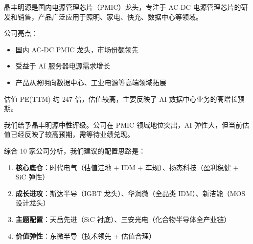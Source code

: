 晶丰明源是国内电源管理芯片（PMIC）龙头，专注于 AC-DC 电源管理芯片的研发和销售，产品广泛应用于照明、家电、快充、数据中心等领域。

公司亮点：
\begin{itemize}[leftmargin=2em]
\item 国内 AC-DC PMIC 龙头，市场份额领先
\item 受益于 AI 服务器电源需求增长
\item 产品从照明向数据中心、工业电源等高端领域拓展
\end{itemize}

估值 PE(TTM) 约 247 倍，估值较高，主要反映了 AI 数据中心业务的高增长预期。

我们给予晶丰明源\textbf{中性}评级。公司在 PMIC 领域地位突出，AI 弹性大，但当前估值已经反映了较高预期，需等待业绩兑现。

\begin{keyinsight}[重点公司投资地图]
综合 10 家公司分析，我们建议的配置思路是：
\begin{enumerate}[leftmargin=2em]
\item \textbf{核心底仓}：时代电气（估值洼地 + IDM + 车规）、扬杰科技（盈利稳健 + SiC 弹性）
\item \textbf{成长进攻}：斯达半导（IGBT 龙头）、华润微（全品类 IDM）、新洁能（MOS 设计龙头）
\item \textbf{主题配置}：天岳先进（SiC 衬底）、三安光电（化合物半导体全产业链）
\item \textbf{价值弹性}：东微半导（技术领先 + 估值合理）
\end{enumerate}
\end{keyinsight}
